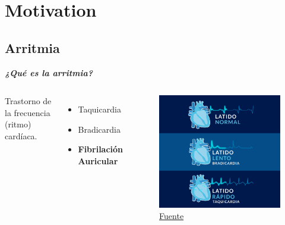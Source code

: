 \section{Motivation}


\subsection{Arritmia}



\begin{frame}
    \begin{center} 
        {\Large \color{TurkishRose}\textbf{\textit{¿Qué es la arritmia?}}} 
    \end{center}
    \pause
     \begin{columns}
        \centering
        Trastorno de la frecuencia (ritmo) cardíaca.
        \begin{itemize}
            \item Taquicardia
            \item Bradicardia
            \item {\color{TurkishRose}\textbf{Fibrilación Auricular}}
        \end{itemize}
        
        \centering
        \begin{figure}
            \centering
            \includegraphics[width=1\textwidth]{Images/arritmia.png}
            \caption{\href{https://cuidandotucorazon.com/wp-content/uploads/2019/07/latido-normal-lento-rapido.gif}{Fuente}}
        \end{figure}
    \end{columns}
    

\end{frame}

